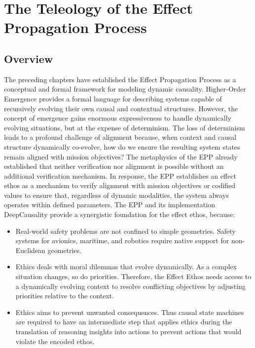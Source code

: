 \section{The Teleology of the Effect Propagation Process}
\label{sec:teleology}

\subsection{Overview}

The preceding chapters have established the Effect Propagation Process as a conceptual and formal framework for modeling dynamic causality. Higher-Order Emergence provides a formal language for describing systems capable of recursively evolving their own causal and contextual structures. However, the concept of emergence gains enormous expressiveness to handle dynamically evolving situations, but at the expense of determinism. The loss of determinism leads to a profound challenge of alignment because, when context and causal structure dynamically co-evolve, how do we ensure the resulting system states remain aligned with mission objectives? The metaphysics of the EPP already established that neither verification nor alignment is possible without an additional verification mechanism. In response, the EPP establishes an effect ethos as a mechanism to verify alignment with mission objectives or codified values to ensure that, regardless of dynamic modalities, the system always operates within defined parameters. The EPP and its implementation DeepCausality provide a synergistic foundation for the effect ethos, because:

\begin{itemize}
    \item Real-world safety problems are not confined to simple geometries. Safety systems for avionics, maritime, and robotics require native support
  for non-Euclidean geometries.
    \item Ethics deals with moral dilemmas that evolve dynamically. As a complex situation changes, so do priorities. Therefore, the Effect Ethos needs access to a dynamically evolving context to resolve conflicting objectives by  adjusting priorities relative to the context. 
    \item Ethics aims to prevent unwanted consequences. Thus causal state machines are required to have an intermediate step that applies ethics during the translation of reasoning insights into actions to prevent actions that would violate the encoded ethos. 
\end{itemize}

